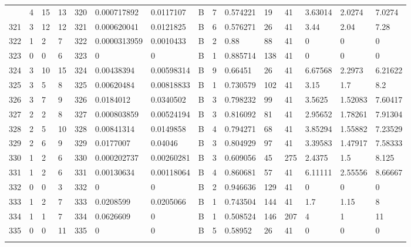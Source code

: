 \begin{latin}
\begin{longtable}{lllllllllllllll}
\begin{comment}
	320 & 4  & 15  & 13 & 320 & 0.000717892    & 0.0117107      & B & 7  & 0.574221 & 19   & 41   & 3.63014 & 2.0274  & 7.0274  \\
	321 & 3  & 12  & 12 & 321 & 0.000620041    & 0.0121825      & B & 6  & 0.576271 & 26   & 41   & 3.44    & 2.04    & 7.28    \\
	322 & 1  & 2   & 7  & 322 & 0.0000313959   & 0.0010433      & B & 2  & 0.88     & 88   & 41   & 0       & 0       & 0       \\
	323 & 0  & 0   & 6  & 323 & 0              & 0              & B & 1  & 0.885714 & 138  & 41   & 0       & 0       & 0       \\
	324 & 3  & 10  & 15 & 324 & 0.00438394     & 0.00598314     & B & 9  & 0.66451  & 26   & 41   & 6.67568 & 2.2973  & 6.21622 \\
	325 & 3  & 5   & 8  & 325 & 0.00620484     & 0.00818833     & B & 1  & 0.730579 & 102  & 41   & 3.15    & 1.7     & 8.2     \\
	326 & 3  & 7   & 9  & 326 & 0.0184012      & 0.0340502      & B & 3  & 0.798232 & 99   & 41   & 3.5625  & 1.52083 & 7.60417 \\
	327 & 2  & 2   & 8  & 327 & 0.000803859    & 0.00524194     & B & 3  & 0.816092 & 81   & 41   & 2.95652 & 1.78261 & 7.91304 \\
	328 & 2  & 5   & 10 & 328 & 0.00841314     & 0.0149858      & B & 4  & 0.794271 & 68   & 41   & 3.85294 & 1.55882 & 7.23529 \\
	329 & 2  & 6   & 9  & 329 & 0.0177007      & 0.04046        & B & 3  & 0.804929 & 97   & 41   & 3.39583 & 1.47917 & 7.58333 \\
	330 & 1  & 2   & 6  & 330 & 0.000202737    & 0.00260281     & B & 3  & 0.609056 & 45   & 275  & 2.4375  & 1.5     & 8.125   \\
	331 & 1  & 2   & 6  & 331 & 0.00130634     & 0.00118064     & B & 4  & 0.860681 & 57   & 41   & 6.11111 & 2.55556 & 8.66667 \\
	332 & 0  & 0   & 3  & 332 & 0              & 0              & B & 2  & 0.946636 & 129  & 41   & 0       & 0       & 0       \\
	333 & 1  & 2   & 7  & 333 & 0.0208599      & 0.0205066      & B & 1  & 0.743504 & 144  & 41   & 1.7     & 1.15    & 8       \\
	334 & 1  & 1   & 7  & 334 & 0.0626609      & 0              & B & 1  & 0.508524 & 146  & 207  & 4       & 1       & 11      \\
	335 & 0  & 0   & 11 & 335 & 0              & 0              & B & 5  & 0.58952  & 26   & 41   & 0       & 0       & 0       \\

\end{comment}
\end{longtable}
\end{latin}
